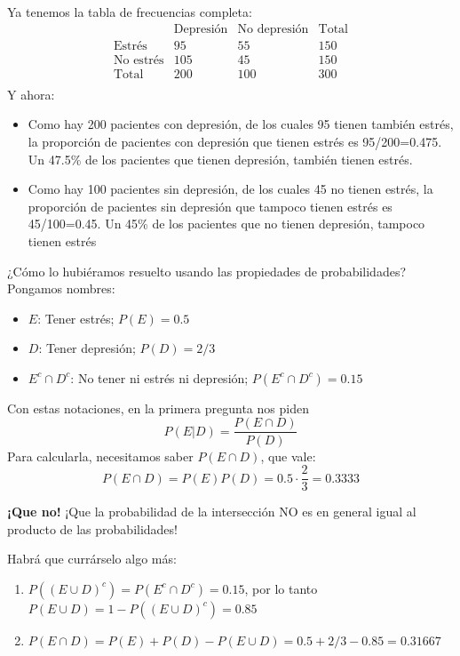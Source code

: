 \documentclass[
]{book}
\theoremstyle{definition}
\theoremstyle{definition}
\theoremstyle{definition}
\theoremstyle{definition}
\theoremstyle{remark}
\begin{document}
Ya tenemos la tabla de frecuencias completa:
\[
\begin{array}{r|c|c|c}
& \text{Depresión} & \text{No depresión} & \text{Total}\\ \hline
\text{Estrés} & 95 & 55 & 150 \\ \hline
\text{No estrés} & 105 & 45 & 150 \\ \hline
\text{Total} &  200 & 100 & 300\\ 
\end{array}
\]
Y ahora:

\begin{itemize}
\item
  Como hay 200 pacientes con depresión, de los cuales 95 tienen también estrés, la proporción de pacientes con depresión que tienen estrés es 95/200=0.475. Un 47.5\% de los pacientes que tienen depresión, también tienen estrés.
\item
  Como hay 100 pacientes sin depresión, de los cuales 45 no tienen estrés, la proporción de pacientes sin depresión que tampoco tienen estrés es 45/100=0.45. Un 45\% de los pacientes que no tienen depresión, tampoco tienen estrés
\end{itemize}

¿Cómo lo hubiéramos resuelto usando las propiedades de probabilidades? Pongamos nombres:

\begin{itemize}
\item
  \(E\): Tener estrés; \(P(E)=0.5\)
\item
  \(D\): Tener depresión; \(P(D)=2/3\)
\item
  \(E^c \cap D^c\): No tener ni estrés ni depresión; \(P(E^c\cap D^c)=0.15\)
\end{itemize}

Con estas notaciones, en la primera pregunta nos piden
\[
P(E|D)=\dfrac{P(E\cap D)}{P(D)}
\]
Para calcularla, necesitamos saber \(P(E\cap D)\), que vale:
\[
P(E\cap D)=P(E)P(D)=0.5\cdot \frac{2}{3}=0.3333
\]

\begin{rmderror}
\textbf{¡Que no!} ¡Que la probabilidad de la intersección NO es en general igual al producto de las probabilidades!
\end{rmderror}

Habrá que currárselo algo más:

\begin{enumerate}
\def\labelenumi{\arabic{enumi}.}
\item
  \(P((E\cup D)^c)=P(E^c\cap D^c)=0.15\), por lo tanto \(P(E\cup D)=1-P((E\cup D)^c)=0.85\)
\item
  \(P(E\cap D)=P(E)+P(D)-P(E\cup D)=0.5+2/3-0.85=0.31667\)
\end{enumerate}
\end{document}
